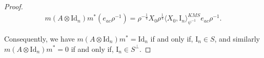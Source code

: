 \documentclass{amsart}
\newcommand{\comments}[1]{}
\begin{document}
\begin{proof}
    \begin{align*}
        m(A \otimes \mathrm{Id}_n)m^\ast(e_{ac}\rho^{-1})
        =\rho^{-\frac{1}{4}} X_0 \rho^{\frac{1}{4}} \langle X_0, \mathrm{I}_n \rangle_{\psi^{-1}}^{KMS} e_{ac} \rho^{-1}.
    \end{align*}
    \comments{
    \begin{align*}
        m(A \otimes \mathrm{Id}_n)m^\ast(e_{ac}\rho^{-1})
            &= \sum_{b}  A(e_{ab}\rho^{-1}) e_{bc} \rho^{-1} \\
            &= \sum_b \left( \sum_i \rho^{-\frac{1}{4}} X_i \rho^{\frac{1}{4}} \left( e_{ab} \rho^{-1} \right) \rho^{\frac{1}{4}} X_i^\ast  \rho^{-\frac{1}{4}} \right) e_{bc} \rho^{-1} \\
            &= \sum_i \rho^{-\frac{1}{4}} X_i \rho^{\frac{1}{4}} \left( \sum_b e_{ab} \rho^{-\frac{3}{4}} X_i^\ast  \rho^{-\frac{1}{4}} e_{bc} \right) \rho^{-1} \\
            &= \sum_i \rho^{-\frac{1}{4}} X_i \rho^{\frac{1}{4}} \mathrm{Tr}\left( \rho^{-\frac{3}{4}} X_i^\ast  \rho^{-\frac{1}{4}} \right) e_{ac} \rho^{-1} \\
            &= \sum_i \rho^{-\frac{1}{4}} X_i \rho^{\frac{1}{4}} \mathrm{Tr}\left(X_i^\ast  \rho^{-1} \right) e_{ac} \rho^{-1} \\
            &= \sum_i \rho^{-\frac{1}{4}} X_i \rho^{\frac{1}{4}} \langle X_i, \mathrm{I}_n \rangle_{\psi^{-1}}^{KMS} e_{ac} \rho^{-1} \\
            &= \rho^{-\frac{1}{4}} X_0 \rho^{\frac{1}{4}} \langle X_0, \mathrm{I}_n \rangle_{\psi^{-1}}^{KMS} e_{ac} \rho^{-1}.
    \end{align*}
    }
    Consequently, we have $m(A \otimes \mathrm{Id}_n) m^\ast = \mathrm{Id}_n$ if and only if, $\mathrm{I}_n \in S$, and similarly $m(A \otimes \mathrm{Id}_n) m^\ast = 0$ if and only if, $\mathrm{I}_n \in S^\bot$.
    

\end{proof}
\end{document}

